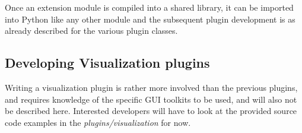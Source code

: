 \documentclass{article}
\begin{document}
Once an extension module is compiled into a shared library, it can be
imported into Python like any other module and the subsequent plugin
development is as already described for the various plugin classes.

\subsection*{Developing Visualization plugins}

Writing a visualization plugin is rather more involved than the
previous plugins, and requires knowledge of the specific GUI toolkits
to be used, and will also not be described here. Interested developers
will have to look at the provided source code examples in the
\emph{plugins/visualization} for now.
\end{document}
